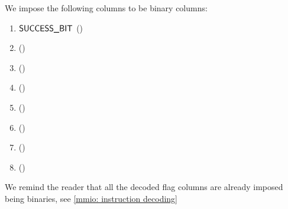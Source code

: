 We impose the following columns to be binary columns:
\begin{multicols}{2}
    \begin{enumerate}
	\item $\textsf{SUCCESS\_BIT}{}$ \quad (\trash)
	\item \fastOp{} \quad (\trash)
	\item \slowOp{} \quad (\trash)
	\item {} \quad (\trash)
	\item {} \quad (\trash)
	\item {} \quad (\trash)
	\item {} \quad (\trash)
	\item {} \quad (\trash)
    \end{enumerate}
\end{multicols}

We remind the reader that all the decoded flag columns are already imposed being binaries, see \ref{mmio: instruction decoding}